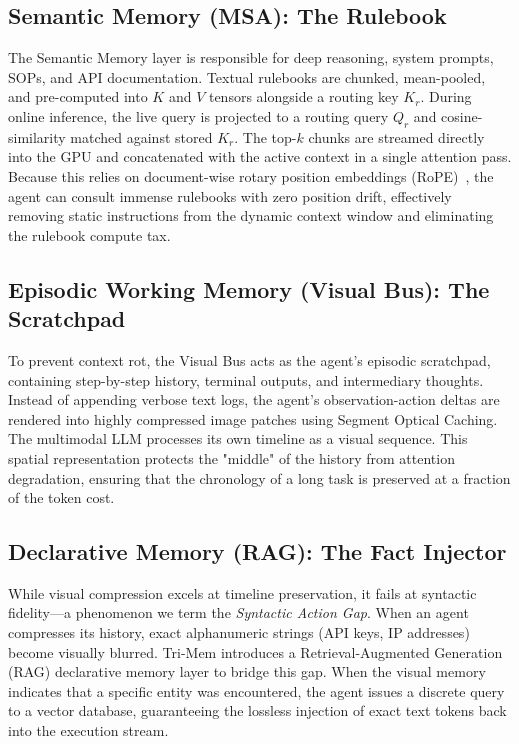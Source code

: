 \documentclass[conference]{IEEEtran}
\begin{document}
\subsection{Semantic Memory (MSA): The Rulebook}
The Semantic Memory layer is responsible for deep reasoning, system prompts, SOPs, and API documentation. Textual rulebooks are chunked, mean-pooled, and pre-computed into $K$ and $V$ tensors alongside a routing key $K_r$. During online inference, the live query is projected to a routing query $Q_r$ and cosine-similarity matched against stored $K_r$. The top-$k$ chunks are streamed directly into the GPU and concatenated with the active context in a single attention pass. Because this relies on document-wise rotary position embeddings (RoPE)~\cite{rope2021}, the agent can consult immense rulebooks with zero position drift, effectively removing static instructions from the dynamic context window and eliminating the rulebook compute tax.

\subsection{Episodic Working Memory (Visual Bus): The Scratchpad}
To prevent context rot, the Visual Bus acts as the agent's episodic scratchpad, containing step-by-step history, terminal outputs, and intermediary thoughts. Instead of appending verbose text logs, the agent's observation-action deltas are rendered into highly compressed image patches using Segment Optical Caching. The multimodal LLM processes its own timeline as a visual sequence. This spatial representation protects the "middle" of the history from attention degradation, ensuring that the chronology of a long task is preserved at a fraction of the token cost.

\subsection{Declarative Memory (RAG): The Fact Injector}
While visual compression excels at timeline preservation, it fails at syntactic fidelity---a phenomenon we term the \textit{Syntactic Action Gap}. When an agent compresses its history, exact alphanumeric strings (API keys, IP addresses) become visually blurred. Tri-Mem introduces a Retrieval-Augmented Generation (RAG) declarative memory layer to bridge this gap. When the visual memory indicates that a specific entity was encountered, the agent issues a discrete query to a vector database, guaranteeing the lossless injection of exact text tokens back into the execution stream.
\end{document}
